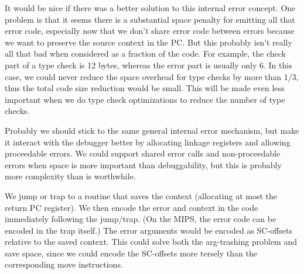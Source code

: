 It would be nice if there was a better solution to this internal error concept.
One problem is that it seems there is a substantial space penalty for emitting
all that error code, especially now that we don't share error code between
errors because we want to preserve the source context in the PC.  But this
probably isn't really all that bad when considered as a fraction of the code.
For example, the check part of a type check is 12 bytes, whereas the error part
is usually only 6.  In this case, we could never reduce the space overhead for
type checks by more than 1/3, thus the total code size reduction would be
small.  This will be made even less important when we do type check
optimizations to reduce the number of type checks.

Probably we should stick to the same general internal error mechanism, but make
it interact with the debugger better by allocating linkage registers and
allowing proceedable errors.  We could support shared error calls and
non-proceedable errors when space is more important than debuggability, but
this is probably more complexity than is worthwhile.

We jump or trap to a routine that saves the context (allocating at most the
return PC register).  We then encode the error and context in the code
immediately following the jump/trap.  (On the MIPS, the error code can be
encoded in the trap itself.)  The error arguments would be encoded as
SC-offsets relative to the saved context.  This could solve both the
arg-trashing problem and save space, since we could encode the SC-offsets more
tersely than the corresponding move instructions.
